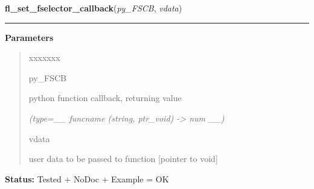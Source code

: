     \label{xformslib:library:fl_set_fselector_callback}

    \vspace{0.5ex}

\hspace{.8\funcindent}\begin{boxedminipage}{\funcwidth}

    \raggedright \textbf{fl\_set\_fselector\_callback}(\textit{py\_FSCB}, \textit{vdata})

    \vspace{-1.5ex}

    \rule{\textwidth}{0.5\fboxrule}
\setlength{\parskip}{2ex}
\setlength{\parskip}{1ex}
      \textbf{Parameters}
      \vspace{-1ex}

      \begin{quote}
        \begin{Ventry}{xxxxxxx}

          \item[py\_FSCB]

          python function callback, returning value

            {\it (type=\_\_ funcname (string, ptr\_void) -{\textgreater} num \_\_)}

          \item[vdata]

          user data to be passed to function [pointer to void]

        \end{Ventry}

      \end{quote}

\textbf{Status:} Tested + NoDoc + Example = OK



    \end{boxedminipage}

    \label{xformslib:library:fl_set_fselector_callback}

    \vspace{0.5ex}

